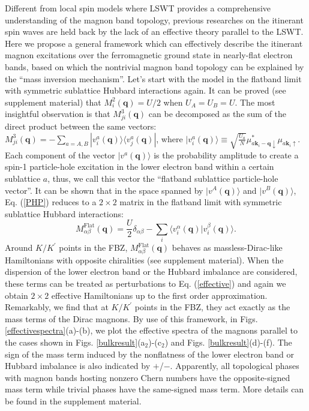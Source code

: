 \documentclass[amsmath,superscriptaddress,showpacs,aps,prl,twocolumn]{revtex4-1}
\begin{document}
\par Different from local spin models where LSWT provides a comprehensive understanding of the magnon band topology, previous researches \cite{Su_PRB2018} on the itinerant spin waves are held back by the lack of an effective theory parallel to the LSWT. Here we propose a general framework which can effectively describe the itinerant magnon excitations over the ferromagnetic ground state in nearly-flat electron bands, based on which the nontrivial magnon band topology can be explained by the ``mass inversion mechanism''. Let's start with the model in the flatband limit with symmetric sublattice Hubbard interactions again. It can be proved (see supplement material) that $M^2_i(\mathbf{q})=U/2$ when $U_A=U_B=U$. The most insightful observation is that $M^3_{ji}(\mathbf{q})$ can be decomposed as the sum of the direct product between the same vectors: $M^3_{ji}(\mathbf{q})=-\sum_{a=A,B}|v^a_i(\mathbf{q})\rangle\langle v^a_j(\mathbf{q})|$, where $|v^a_i(\mathbf{q})\rangle\equiv\sqrt{\frac{U_a}{N}}\mu^{\ast}_{a\mathbf{k}_i-\mathbf{q}\downarrow}\mu_{a\mathbf{k}_{i}\uparrow}$. Each component of the vector $|v^a(\mathbf{q})\rangle$ is the probability amplitude to create a spin-1 particle-hole excitation in the lower electron band within a certain sublattice $a$, thus, we call this vector the ``flatband sublattice particle-hole vector''. It can be shown that in the space spanned by $|v^A(\mathbf{q})\rangle$ and $|v^B(\mathbf{q})\rangle$, Eq. (\ref{PHP}) reduces to a $2\times2$ matrix in the flatband limit with symmetric sublattice Hubbard interactions:
\begin{equation}\label{effective}
M^\text{Flat}_{\alpha\beta}(\mathbf{q})=\frac{U}{2}\delta_{\alpha\beta}-\sum_i\langle v_i^\alpha(\mathbf{q})|v_i^\beta(\mathbf{q})\rangle.
\end{equation}
Around $K/K^\prime$ points in the FBZ, $M^\text{Flat}_{\alpha\beta}(\mathbf{q})$ behaves as massless-Dirac-like Hamiltonians with opposite chiralities (see supplement material). When the dispersion of the lower electron band or the Hubbard imbalance are considered, these terms can be treated as perturbations to Eq. (\ref{effective}) and again we obtain $2\times2$ effective Hamiltonians up to the first order approximation. Remarkably, we find that at $K/K^\prime$ points in the FBZ, they act exactly as the mass terms of the Dirac magnons. By use of this framework, in Figs. \ref{effectivespectra}(a)-(b), we plot the effective spectra of the magnons parallel to the cases shown in Figs. \ref{bulkresult}(a$_2$)-(c$_2$) and Figs. \ref{bulkresult}(d)-(f). The sign of the mass term induced by the nonflatness of the lower electron band or Hubbard imbalance is also indicated by $+$/$-$. Apparently, all topological phases with magnon bands hosting nonzero Chern numbers have the opposite-signed mass term while trivial phases have the same-signed mass term. More details can be found in the supplement material.
\end{document}
